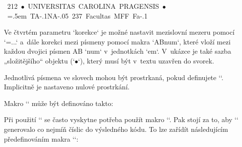 { 

\begtt
\hbox{%
\circletext {1.7cm} {212}  {{$\bullet$} UNIVERSITAS CAROLINA PRAGENSIS {$\bullet$}} 
                           {\spaceskip=.5em \kpcirc TA{-.1}\kpcirc NA{-.05}} 
\circletext {-1.7cm} {237} {Facultas MFF} 
                           {\kpcirc Fa{-.1}} 
} 
\endtt


Ve čtvrtém parametru `korekce` je možné nastavit mezislovní mezeru pomocí `\spaceskip=...` a~dále korekci mezi písmeny pomocí makra `\kpcirc AB{num}`, které vloží mezi každou dvojici písmen AB `\kern num` v~jednotkách `em`. V~ukázce je také sazba „složitějšího“ objektu (`$\bullet$`), který musí být v~textu uzavřen do svorek. 



Jednotlivá písmena ve slovech mohou být prostrkaná, pokud definujete `\def\circletextS{\kern hodnota prostrkání}`. Implicitně je nastaveno nulové prostrkání. 



Makro `\circletext` může být definováno takto: 

\begtt
\newdimen\tmpdimA 
\def\circletext#1#2#3#4{\hbox\bgroup 
    \tmpdim=14668pt \tmpdimA=#1 \divide\tmpdimA by256 \divide\tmpdim by\tmpdimA 
    \edef\tmpC{\expandafter\ignorept\the\tmpdim}%
    \setbox0=\hbox{\ifdim#1<0pt X\fi}%
    \tmpdimA=0pt \baselineskip=#1 \advance\baselineskip by-\ht0 \lineskiplimit=-\maxdimen 
    \tmpdim=#2pt \advance\tmpdim by-\ifdim#1<0pt-\fi 90pt 
    \def\tmpb{{}#3}\replacestrings{ }{{ }}#4%
    \pdfsave \pdfrotate{\expandafter\ignorept\the\tmpdim}%
    \expandafter\circletextA\tmpb\relax 
} 
\def\circletextA#1{\ifx#1\relax\pdfrestore\egroup\ignorespaces\else 
    \ifx^#1^\else \setbox0=\hbox{#1\circletextS}%
       \ifdim\tmpdimA=0pt \else 
          \advance\tmpdimA by.5\wd0 \dimen0=\tmpC\tmpdimA 
          \pdfrotate{-\expandafter\ignorept\the\dimen0}%
       \fi 
       \tmpdimA=.5\wd0 
       \vbox to0pt{\vss\hbox to0pt{\hss#1\hss}\null}%
    \fi 
    \expandafter\circletextA\fi 
} 
\def\kpcirc#1#2#3{\replacestrings{#1#2}{#1{\kern#3em}#2}} 
\def\circletextS{} 
\endtt

 


Při použití `\pdfliteral` se často vyskytne potřeba použít makro `\ignorept`. Pak stojí za to, aby `\ignorept` generovalo co nejmíň číslic do výsledného kódu. To lze zařídít následujícím předefinováním makra `\ignorept`: 

}
